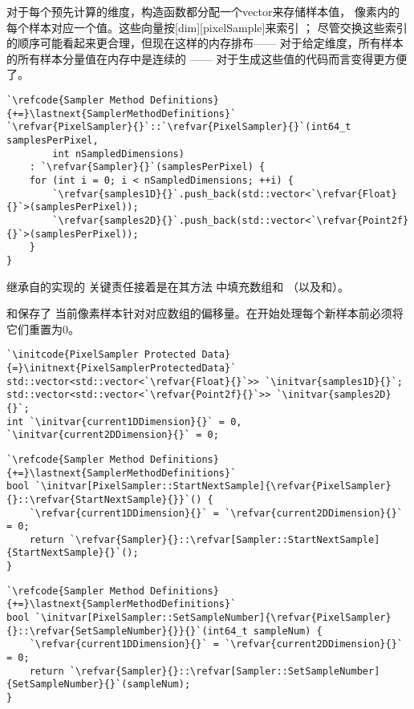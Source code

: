 对于每个预先计算的维度，构造函数都分配一个{\ttfamily vector}来存储样本值，
像素内的每个样本对应一个值。这些向量按{\ttfamily{}[dim][pixelSample]}来索引
；
尽管交换这些索引的顺序可能看起来更合理，但现在这样的内存排布——
对于给定维度，所有样本的所有样本分量值在内存中是连续的
——
对于生成这些值的代码而言变得更方便了。
\begin{lstlisting}
`\refcode{Sampler Method Definitions}{+=}\lastnext{SamplerMethodDefinitions}`
`\refvar{PixelSampler}{}`::`\refvar{PixelSampler}{}`(int64_t samplesPerPixel,
        int nSampledDimensions)
    : `\refvar{Sampler}{}`(samplesPerPixel) {
    for (int i = 0; i < nSampledDimensions; ++i) {
        `\refvar{samples1D}{}`.push_back(std::vector<`\refvar{Float}{}`>(samplesPerPixel));
        `\refvar{samples2D}{}`.push_back(std::vector<`\refvar{Point2f}{}`>(samplesPerPixel));
    }
}
\end{lstlisting}

继承自的实现的
关键责任接着是在其方法
中填充数组和
（以及和）。

和保存了
当前像素样本针对对应数组的偏移量。在开始处理每个新样本前必须将它们重置为0。
\begin{lstlisting}
`\initcode{PixelSampler Protected Data}{=}\initnext{PixelSamplerProtectedData}`
std::vector<std::vector<`\refvar{Float}{}`>> `\initvar{samples1D}{}`;
std::vector<std::vector<`\refvar{Point2f}{}`>> `\initvar{samples2D}{}`;
int `\initvar{current1DDimension}{}` = 0, `\initvar{current2DDimension}{}` = 0;
\end{lstlisting}
\begin{lstlisting}
`\refcode{Sampler Method Definitions}{+=}\lastnext{SamplerMethodDefinitions}`
bool `\initvar[PixelSampler::StartNextSample]{\refvar{PixelSampler}{}::\refvar{StartNextSample}{}}`() {
    `\refvar{current1DDimension}{}` = `\refvar{current2DDimension}{}` = 0;
    return `\refvar{Sampler}{}::\refvar[Sampler::StartNextSample]{StartNextSample}{}`();
}
\end{lstlisting}
\begin{lstlisting}
`\refcode{Sampler Method Definitions}{+=}\lastnext{SamplerMethodDefinitions}`
bool `\initvar[PixelSampler::SetSampleNumber]{\refvar{PixelSampler}{}::\refvar{SetSampleNumber}{}}{}`(int64_t sampleNum) {
    `\refvar{current1DDimension}{}` = `\refvar{current2DDimension}{}` = 0;
    return `\refvar{Sampler}{}::\refvar[Sampler::SetSampleNumber]{SetSampleNumber}{}`(sampleNum);
}
\end{lstlisting}

